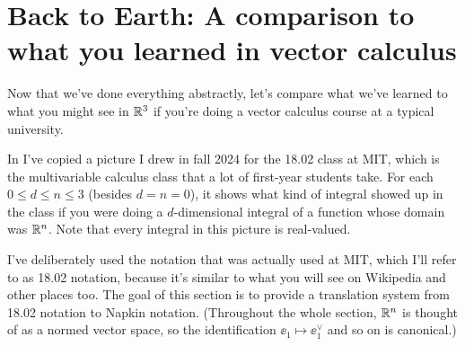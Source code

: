 \section{Back to Earth: A comparison to what you learned in vector calculus}
Now that we've done everything abstractly,
let's compare what we've learned to what you might see in $\mathbb R^3$
if you're doing a vector calculus course at a typical university.

In  I've copied a picture I drew in fall 2024
for the 18.02 class at MIT,
which is the multivariable calculus class that a lot of first-year students take.
For each $0 \le d \le n \le 3$ (besides $d=n=0$),
it shows what kind of integral showed up in the class
if you were doing a $d$-dimensional integral of a function whose domain was $\mathbb R^n$.
Note that every integral in this picture is real-valued.

I've deliberately used the notation that was actually used at MIT,
which I'll refer to as 18.02 notation,
because it's similar to what you will see on Wikipedia and other places too.
The goal of this section is to provide a translation system from 18.02 notation to Napkin notation.
(Throughout the whole section, $\mathbb R^n$ is thought of as a normed vector space,
so the identification $\ee_1 \mapsto \ee_1^\vee$ and so on is canonical.)

